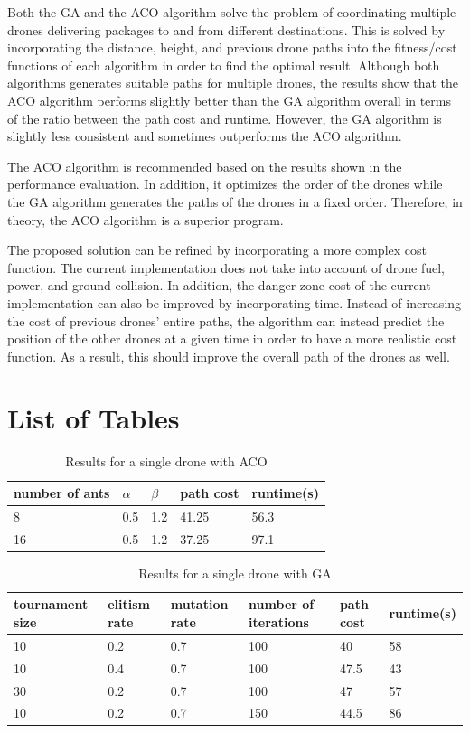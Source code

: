 \documentclass[conference]{IEEEtran}
\begin{document}
Both the GA and the ACO algorithm solve the problem of coordinating multiple drones delivering packages to and from different destinations. This is solved by incorporating the distance, height, and previous drone paths into the fitness/cost functions of each algorithm in order to find the optimal result. Although both algorithms generates suitable paths for multiple drones, the results show that the ACO algorithm performs slightly better than the GA algorithm overall in terms of the ratio between the path cost and runtime. However, the GA algorithm is slightly less consistent and sometimes outperforms the ACO algorithm.

The ACO algorithm is recommended based on the results shown in the performance evaluation. In addition, it optimizes the order of the drones while the GA algorithm generates the paths of the drones in a fixed order. Therefore, in theory, the ACO algorithm is a superior program.

The proposed solution can be refined by incorporating a more complex cost function. The current implementation does not take into account of drone fuel, power, and ground collision. In addition, the danger zone cost of the current implementation can also be improved by incorporating time. Instead of increasing the cost of previous drones' entire paths, the algorithm can instead predict the position of the other drones at a given time in order to have a more realistic cost function. As a result, this should improve the overall path of the drones as well.

\newpage

\section{List of Tables}
\begin{table}[H]
\centering
\begin{tabular}{ | m{1cm} | m{1cm}| m{1cm} | m{1.5cm} | m{1.5cm} |} 
\hline
number of ants & $\alpha$ & $\beta$ & path cost & runtime(s) \\ 
\hline
8 & 0.5 & 1.2 & 41.25 & 56.3 \\
\hline
16 & 0.5 & 1.2 & 37.25 & 97.1 \\ 
\hline
\end{tabular}
\caption{Results for a single drone with ACO} \label{tab:single_aco}
\end{table}

\begin{table}[H]
\centering
\begin{tabular}{ | m{1.5cm} | m{1cm}| m{1cm} | m{1.5cm} | m{1.5cm} | m{1.5cm} |} 
\hline
tournament size & elitism rate & mutation rate & number of iterations & path cost & runtime(s) \\ 
\hline
10 & 0.2 & 0.7 & 100 & 40 & 58 \\ 
\hline
10 & 0.4 & 0.7 & 100 & 47.5 &  43  \\ 
\hline
30 & 0.2 & 0.7 & 100 & 47 &  57  \\ 
\hline
10 & 0.2 & 0.7 & 150 & 44.5 &  86  \\ 
\hline
\end{tabular}
\caption{Results for a single drone with GA} \label{tab:single_ga}
\end{table}
\end{document}
